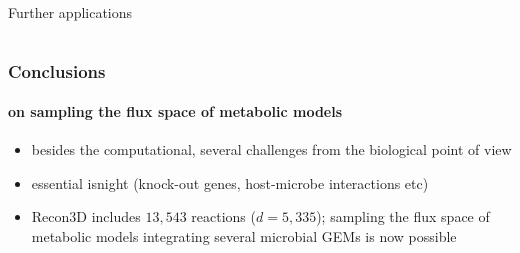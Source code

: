 \documentclass{beamer}
\begin{document}
\begin{frame}{Further applications}
\begin{singlespace}
\begin{columns}[onlytextwidth]
         \end{columns}
      \end{singlespace}
   \end{frame}
   \fi



         


 


   \begin{frame}
      \frametitle{Conclusions}
      \framesubtitle{on sampling the flux space of metabolic models}
      
      \begin{itemize}
         \item besides the computational, several challenges from the biological point of view
         \item essential isnight (knock-out genes, host-microbe interactions etc)
         \item Recon3D includes $13,543$ reactions ($d=5,335$); sampling the flux space of metabolic models integrating several microbial GEMs is now possible
      \end{itemize}
   
   \end{frame}
\end{document}
